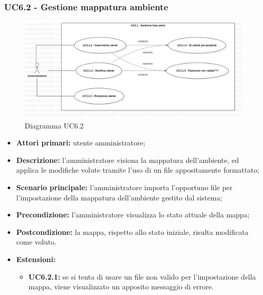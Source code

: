 \subsubsection{UC6.2 - Gestione mappatura ambiente}
	\begin{center}
		\begin{figure}[h!]
			\includegraphics[width=15cm]{images/uc3.1.jpg}
			\caption{Diagramma UC6.2}
		\end{figure}
	\end{center}
	\begin{itemize}
		\item \textbf{Attori primari:} utente amministratore;
		\item \textbf{Descrizione:} l'amministratore visiona la mappatura dell'ambiente, ed applica le modifiche volute tramite l'uso di un file appositamente formattato;
		\item \textbf{Scenario principale:} l'amministratore importa l'opportuno file per l'impostazione della mappatura dell'ambiente gestito dal sistema;
		\item \textbf{Precondizione:} l'amministratore visualizza lo stato attuale della mappa;
		\item \textbf{Postcondizione:} la mappa, rispetto allo stato iniziale, risulta modificata come voluto.
		\item \textbf{Estensioni:}
		\begin{itemize}
			\item \textbf{UC6.2.1:} se si tenta di usare un file non valido per l'impostazione della mappa, viene visualizzato un apposito messaggio di errore.
		\end{itemize}
	\end{itemize}

